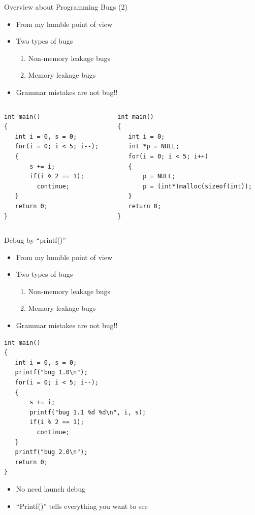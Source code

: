 \begin{frame}[fragile]{Overview about Programming Bugs (2)}
\begin{itemize}
	\item {From my humble point of view}
	\item {Two types of bugs}
	\begin{enumerate}
		\item {Non-memory leakage bugs}
		\item {Memory leakage bugs}
	\end{enumerate}
	\item {Grammar mistakes are not bug!!}
\end{itemize}
\vspace{-0.2in}
\begin{columns}
\begin{column}{0.48\linewidth}
\begin{lstlisting}
int main()
{
   int i = 0, s = 0;
   for(i = 0; i < 5; i--);
   {
       s += i;
       if(i % 2 == 1);
         continue;
   }
   return 0;
}
\end{lstlisting}
\end{column}
\begin{column}{0.48\linewidth}
\begin{lstlisting}
int main()
{
   int i = 0;
   int *p = NULL;
   for(i = 0; i < 5; i++)
   {
       p = NULL;
       p = (int*)malloc(sizeof(int));
   }
   return 0;
}
\end{lstlisting}
\end{column}
\end{columns}
\end{frame}

\begin{frame}[fragile]{Debug by ``printf()''}

\begin{itemize}
	\item {From my humble point of view}
	\item {Two types of bugs}
	\begin{enumerate}
		\item {Non-memory leakage bugs}
		\item {Memory leakage bugs}
	\end{enumerate}
	\item {Grammar mistakes are not bug!!}
\end{itemize}

\begin{lstlisting}
int main()
{
   int i = 0, s = 0;
   printf("bug 1.0\n");
   for(i = 0; i < 5; i--);
   {
       s += i;
       printf("bug 1.1 %d %d\n", i, s);
       if(i % 2 == 1);
         continue;
   }
   printf("bug 2.0\n");
   return 0;
}
\end{lstlisting}
\vspace{-0.05in}
\begin{itemize}
	\item {No need launch debug}
	\item {``Printf()'' tells everything you want to see}
\end{itemize}
\end{frame}